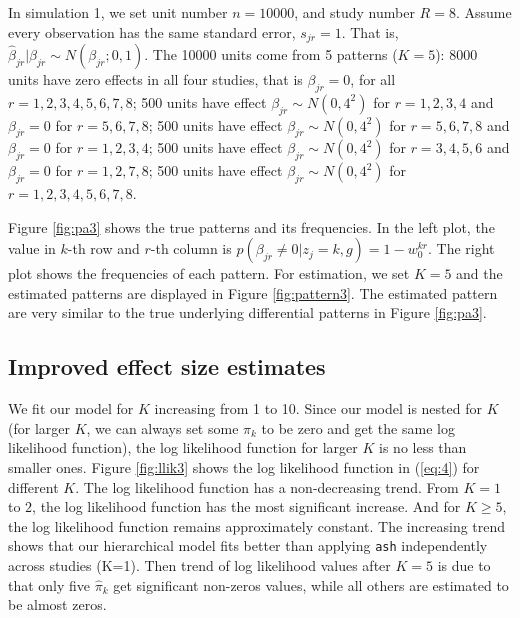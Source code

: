 \documentclass[12pt]{article}
\begin{document}
\vspace{4mm}\noindent In simulation 1, we set unit number $n = 10000$, and study number $R = 8$. Assume every observation has the same standard error, $s_{jr}=1$. That is, $\hat\beta_{jr}|\beta_{jr}\sim N(\beta_{jr};0,1)$. The 10000 units come from 5 patterns ($K=5$): 8000 units have zero effects in all four studies, that is $\beta_{jr}=0$, for all $r = 1,2,3,4,5,6,7,8$; 500 units have effect $\beta_{jr}\sim N(0,4^2)$ for $r =1,2,3,4$ and $\beta_{jr}=0$ for $r =5, 6,7,8$; 500 units have effect $\beta_{jr}\sim N(0,4^2)$ for $r =5, 6,7,8$ and $\beta_{jr}=0$ for $r = 1,2,3,4$; 500 units have effect $\beta_{jr}\sim N(0,4^2)$ for $r =3,4,5,6$ and $\beta_{jr}=0$ for $r = 1,2,7,8$; 500 units have effect $\beta_{jr}\sim N(0,4^2)$ for $r =1,2,3,4,5,6,7,8$. 

\vspace{4mm}\noindent Figure \ref{fig:pa3} shows the true patterns and its frequencies. In the left plot, the value in $k$-th row and $r$-th column is $p(\beta_{jr}\neq 0|z_j=k,g)=1-w_0^{kr}$. The right plot shows the frequencies of each pattern. For estimation, we set $K=5$ and the estimated patterns are displayed in Figure \ref{fig:pattern3}. The estimated pattern are very similar to the true underlying differential patterns in Figure \ref{fig:pa3}. 

\vspace{5mm}
\subsection{Improved effect size estimates}

\vspace{4mm}\noindent We fit our model for $K$ increasing from 1 to 10. Since our model is nested for $K$ (for larger $K$, we can always set some $\pi_k$ to be zero and get the same log likelihood function), the log likelihood function for larger $K$ is no less than smaller ones. Figure \ref{fig:llik3} shows the log likelihood function in (\ref{eq:4}) for different $K$. The log likelihood function has a non-decreasing trend. From $K=1$ to $2$, the log likelihood function has the most significant increase. And for $K\geq 5$, the log likelihood function remains approximately constant. The increasing trend shows that our hierarchical model fits better than applying {\tt ash} independently across studies (K=1). Then trend of log likelihood values after $K=5$ is due to that only five $\hat\pi_k$ get significant non-zeros values, while all others are estimated to be almost zeros. 
\end{document}
